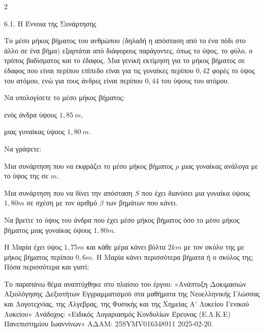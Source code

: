 \begin{ylh}{2}
    \item 6.1. Η Έννοια της Συνάρτησης
\end{ylh}
Το μέσο μήκος βήματος του ανθρώπου (δηλαδή η απόσταση από το ένα πόδι στο άλλο σε ένα βήμα) εξαρτάται από διάφορους παράγοντες, όπως το ύψος, το φύλο, ο τρόπος βαδίσματος και το έδαφος. Μια γενική εκτίμηση για το μήκος βήματος σε έδαφος που είναι περίπου επίπεδο είναι για τις γυναίκες περίπου $0,42$ φορές το ύψος του ατόμου, ενώ για τους άνδρες είναι περίπου $0,44$ του ύψους του ατόμου.

\begin{alist}
\item Να υπολογίσετε το μέσο μήκος βήματος:

\begin{rlist}
\item
  ενός άνδρα ύψους $1,85\ m$,
\item
  μιας γυναίκας ύψους $1,80\ m.$
\end{rlist}
\item Να γράψετε:
\begin{rlist}
\item
  Μια συνάρτηση που να εκφράζει το μέσο μήκος βήματος $p$ μιας γυναίκας ανάλογα με το ύψος της σε $m$.
\item
  Μια συνάρτηση που να δίνει την απόσταση $S$ που έχει διανύσει μια γυναίκα ύψους $1,80m$ σε σχέση με τον αριθμό $\beta$ των βημάτων που κάνει.
\end{rlist}
\item Να βρείτε το ύψος του άνδρα που έχει μέσο μήκος βήματος όσο το μέσο μήκος βήματος μιας γυναίκας ύψους $1,80m$.
\item Η Μαρία έχει ύψος $1,75m$ και κάθε μέρα κάνει βόλτα $2km$ με τον σκύλο της με μήκος βήματος περίπου $0,6m$. Η Μαρία κάνει περισσότερα βήματα ή ο σκύλος της; Πόσα περισσότερα και γιατί;


{\footnotesize Το παραπάνω θέμα αναπτύχθηκε στο πλαίσιο του έργου: «Ανάπτυξη Δοκιμασιών Αξιολόγησης Δεξιοτήτων Εγγραμματισμού στα μαθήματα της Νεοελληνικής Γλώσσας και Λογοτεχνίας, της Άλγεβρας, της Φυσικής και της Χημείας Α' Λυκείου Γενικού Λυκείου» Ανάδοχος: «Ειδικός Λογαριασμός Κονδυλίων Έρευνας (Ε.Λ.Κ.Ε) Πανεπιστημίου Ιωαννίνων» ΑΔΑΜ: 25SYMV016348911 2025-02-20.}
\end{alist}

